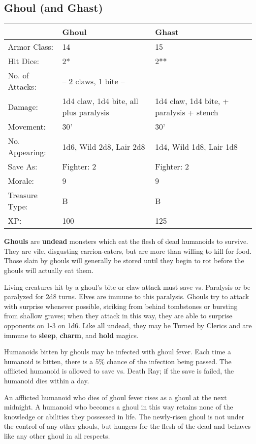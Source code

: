 \documentclass[a4paper,twoside,openany,10pt]{book}
\begin{document}
\begin{multicols}{2}
\subsection*{Ghoul (and Ghast)}\label{ghoul-and-ghast}

\begin{tabularx}{0.48\textwidth}{@{}lXX@{}}
& Ghoul & Ghast \\\hline
Armor Class: & 14 & 15 \\\hline
Hit Dice: & 2* & 2** \\\hline
No. of Attacks: & -- 2 claws, 1 bite -- & \\\hline
Damage: & 1d4 claw, 1d4 bite, all plus paralysis & 1d4 claw, 1d4 bite, +
paralysis + stench \\\hline
Movement: & 30' & 30' \\\hline
No. Appearing: & 1d6, Wild 2d8, Lair 2d8 & 1d4, Wild 1d8, Lair 1d8 \\\hline
Save As: & Fighter: 2 & Fighter: 2 \\\hline
Morale: & 9 & 9 \\\hline
Treasure Type: & B & B \\\hline
XP: & 100 & 125 \\\hline
\end{tabularx}\medskip

\textbf{Ghouls} are \textbf{undead }monsters which eat the flesh of dead humanoids to survive. They are vile, disgusting carrion-eaters, but are more than willing to kill for food. Those slain by ghouls will generally be stored until they begin to rot before the ghouls will actually eat them.

Living creatures hit by a ghoul's bite or claw attack must save vs. Paralysis or be paralyzed for 2d8 turns. Elves are immune to this paralysis. Ghouls try to attack with surprise whenever possible, striking from behind tombstones or bursting from shallow graves; when they attack in this way, they are able to surprise opponents on 1-3 on 1d6. Like all undead, they may be Turned by Clerics and are immune to \textbf{sleep}, \textbf{charm}, and \textbf{hold} magics.

Humanoids bitten by ghouls may be infected with ghoul fever. Each time a humanoid is bitten, there is a 5\% chance of the infection being passed. The afflicted humanoid is allowed to save vs. Death Ray; if the save is failed, the humanoid dies within a day.

An afflicted humanoid who dies of ghoul fever rises as a ghoul at the next midnight. A humanoid who becomes a ghoul in this way retains none of the knowledge or abilities they possessed in life. The newly-risen ghoul is not under the control of any other ghouls, but hungers for the flesh of the dead and behaves like any other ghoul in all respects.


\end{multicols}
\end{document}
